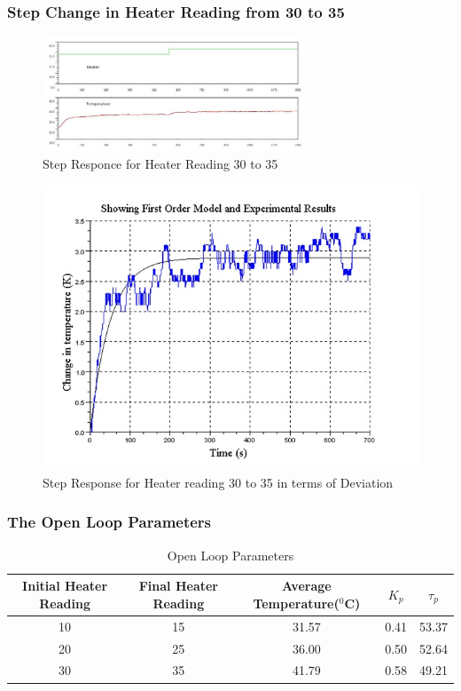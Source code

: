 \subsubsection{Step Change in Heater Reading from 30 to 35}
%
\begin{figure}[h]
\centering
	\includegraphics[width = 0.7\textwidth]{Vikas_self/report_tex/parameter_estimation/30to35.jpg}
		\caption{Step Responce for Heater Reading 30 to 35}
	\label{fig:30to35}
\end{figure}
%
\begin{figure}[h]
\centering
	\includegraphics[width = .75\textwidth]{Vikas_self/report_tex/parameter_estimation/optimized30to35.jpg}
		\caption{Step Response for Heater reading 30 to 35 in terms of Deviation}
	\label{optimized30to35}
\end{figure}

\newpage
\subsubsection{The Open Loop Parameters}
\begin{table}[h]
	\begin{tabular}{|c|c|c|c|c|}\hline
	Initial Heater Reading&Final Heater Reading&Average Temperature($^0$C)&$K_p$&$\tau_p$\\ \hline \hline
	10	&15	&31.57	&0.41	&53.37\\ \hline
	20	&25	&36.00	&0.50	&52.64\\ \hline
	30	&35	&41.79	&0.58	&49.21\\ \hline
		
	\end{tabular}
	\caption{Open Loop Parameters}
	\label{tab:OpenLoopParameters}
\end{table}


